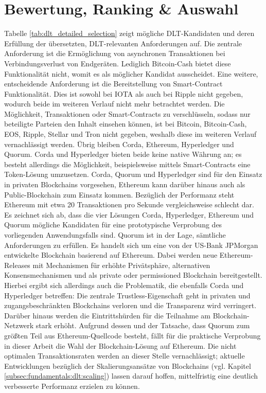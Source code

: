 %
%
\section{Bewertung, Ranking \& Auswahl}
\label{sec:dlt_selection:rating}
Tabelle \ref{tab:dlt_detailed_selection} zeigt mögliche \ac{DLT}-Kandidaten und deren Erfüllung der übersetzten, \ac{DLT}-relevanten Anforderungen auf. Die zentrale Anforderung ist die Ermöglichung von asynchronen Transaktionen bei Verbindungsverlust von Endgeräten. Lediglich Bitcoin-Cash bietet diese Funktionalität nicht, womit es als möglicher Kandidat ausscheidet. Eine weitere, entscheidende Anforderung ist die Bereitstellung von Smart-Contract Funktionalität. Dies ist sowohl bei IOTA als auch bei Ripple nicht gegeben, wodurch beide im weiteren Verlauf nicht mehr betrachtet werden. Die Möglichkeit, Transaktionen oder Smart-Contracts zu verschlüsseln, sodass nur beteiligte Parteien den Inhalt einsehen können, ist bei Bitcoin, Bitcoin-Cash, EOS, Ripple, Stellar und Tron nicht gegeben, weshalb diese im weiteren Verlauf vernachlässigt werden. Übrig bleiben Corda, Ethereum, Hyperledger und Quorum. Corda und Hyperledger bieten beide keine native Währung an; es besteht allerdings die Möglichkeit, beispielsweise mittels Smart-Contracts eine Token-Lösung umzusetzen. Corda, Quorum und Hyperledger sind für den Einsatz in privaten Blockchains vorgesehen, Ethereum kann darüber hinaus auch als Public-Blockchain zum Einsatz kommen. Bezüglich der Performanz steht Ethereum mit etwa 20 Transaktionen pro Sekunde vergleichsweise schlecht dar.\\
Es zeichnet sich ab, dass die vier Lösungen Corda, Hyperledger, Ethereum und Quorum mögliche Kandidaten für eine prototypische Verprobung des vorliegenden Anwendungsfalls sind. Quorum ist in der Lage, sämtliche Anforderungen zu erfüllen. Es handelt sich um eine von der US-Bank JPMorgan entwickelte Blockchain basierend auf Ethereum. Dabei werden neue Ethereum-Releases mit Mechanismen für erhöhte Privätsphäre, alternativen Konsensmechanismen und als private oder permissioned Blockchain bereitgestellt. Hierbei ergibt sich allerdings auch die Problematik, die ebenfalls Corda und Hyperledger betreffen: Die zentrale Trustless-Eigenschaft geht in privaten und zugangsbeschränkten Blockchains verloren und die Transparenz wird verringert. Darüber hinaus werden die Eintrittshürden für die Teilnahme am Blockchain-Netzwerk stark erhöht. Aufgrund dessen und der Tatsache, dass Quorum zum größten Teil aus Ethereum-Quellcode besteht, fällt für die praktische Verprobung in dieser Arbeit die Wahl der Blockchain-Lösung auf Ethereum. Die nicht optimalen Transaktionsraten werden an dieser Stelle vernachlässigt; aktuelle Entwicklungen bezüglich der Skalierungsansätze von Blockchains (vgl. Kapitel \ref{subsec:fundamentals:dlt:scaling}) lassen darauf hoffen, mittelfristig eine deutlich verbesserte Performanz erzielen zu können.

